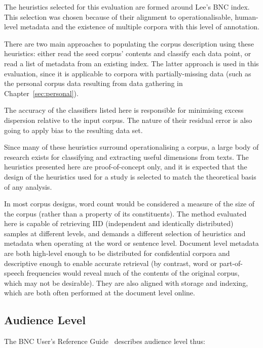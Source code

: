 The heuristics selected for this evaluation are formed around Lee's BNC index\cite{lee2003bnc}.  This selection was chosen because of their alignment to operationalisable, human-level metadata and the existence of multiple corpora with this level of annotation.



There are two main approaches to populating the corpus description using these heuristics: either read the seed corpus' contents and classify each data point, or read a list of metadata from an existing index.  The latter approach is used in this evaluation, since it is applicable to corpora with partially-missing data (such as the personal corpus data resulting from data gathering in Chapter~\ref{sec:personal}).

The accuracy of the classifiers listed here is responsible for minimising excess dispersion relative to the input corpus.  The nature of their residual error is also going to apply bias to the resulting data set.

Since many of these heuristics surround operationalising a corpus, a large body of research exists for classifying and extracting useful dimensions from texts.  The heuristics presented here are proof-of-concept only, and it is expected that the design of the heuristics used for a study is selected to match the theoretical basis of any analysis.

In most corpus designs, word count would be considered a measure of the size of the corpus (rather than a property of its constituents).  The method evaluated here is capable of retrieving IID (independent and identically distributed) samples at different levels, and demands a different selection of heuristics and metadata when operating at the word or sentence level.  Document level metadata are both high-level enough to be distributed for confidential corpora and descriptive enough to enable accurate retrieval (by contrast, word or part-of-speech frequencies would reveal much of the contents of the original corpus, which may not be desirable).  They are also aligned with storage and indexing, which are both often performed at the document level online.




\subsection{Audience Level}
The BNC User's Reference Guide~\cite[p. 14]{burnard1995users}
describes audience level thus:

